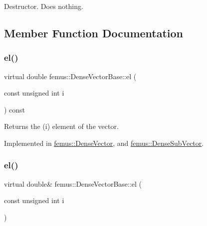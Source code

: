 Destructor. Does nothing. 



\subsection{Member Function Documentation}
\mbox{\label{classfemus_1_1_dense_vector_base_ae2a833cdebb39552185cb66b139758e8}} 
\subsubsection{\texorpdfstring{el()}{el()}\hspace{0.1cm}{\footnotesize\ttfamily [1/2]}}
{\footnotesize\ttfamily virtual double femus\+::\+Dense\+Vector\+Base\+::el (\begin{DoxyParamCaption}\item[{const unsigned int}]{i }\end{DoxyParamCaption}) const\hspace{0.3cm}{\ttfamily [pure virtual]}}


\begin{DoxyItemize}
\item \begin{DoxyReturn}{Returns}
the {\ttfamily }(i) element of the vector. 
\end{DoxyReturn}

\end{DoxyItemize}

Implemented in \mbox{\hyperlink{classfemus_1_1_dense_vector_aff2ffaa4a8b334a0c913fa0d79223e30}{femus\+::\+Dense\+Vector}}, and \mbox{\hyperlink{classfemus_1_1_dense_sub_vector_a7e95ed027b438413f00d790ff5c95fb2}{femus\+::\+Dense\+Sub\+Vector}}.

\mbox{\label{classfemus_1_1_dense_vector_base_a521863934215d5f43225004b091864f5}} 
\subsubsection{\texorpdfstring{el()}{el()}\hspace{0.1cm}{\footnotesize\ttfamily [2/2]}}
{\footnotesize\ttfamily virtual double\& femus\+::\+Dense\+Vector\+Base\+::el (\begin{DoxyParamCaption}\item[{const unsigned int}]{i }\end{DoxyParamCaption})\hspace{0.3cm}{\ttfamily [pure virtual]}}


